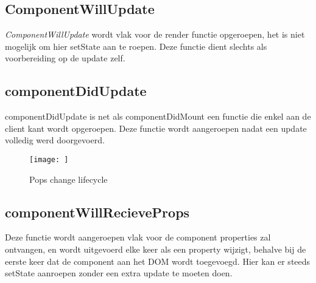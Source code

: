 	\subsection{ComponentWillUpdate}
		
		\emph{ComponentWillUpdate} wordt vlak voor de render functie opgeroepen, het is niet mogelijk om hier setState aan te roepen. Deze functie dient slechts als voorbereiding op de update zelf.
	
	\subsection{componentDidUpdate}
		
		componentDidUpdate is net als componentDidMount een functie die enkel aan de client kant wordt opgeroepen. Deze functie wordt aangeroepen nadat een update volledig werd doorgevoerd.
		
		\begin{figure}
			\centering
			\texttt{[image: ]}%
			\caption{Pops change lifecycle}%
			\label{fig:changelifecycle}%
		\end{figure}
	
	\subsection{componentWillRecieveProps}
		
		Deze functie wordt aangeroepen vlak voor de component properties zal ontvangen, en wordt uitgevoerd elke keer als een property wijzigt, behalve bij de eerste keer dat de component aan het DOM wordt toegevoegd. Hier kan er steeds setState aanroepen zonder een extra update te moeten doen.
